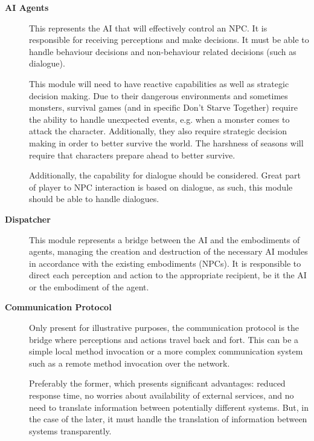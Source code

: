 \begin{description}
	\item[\textbf{AI Agents}] \hfill
    
    This represents the \ac{AI} that will effectively control an \ac{NPC}.
    It is responsible for receiving perceptions and make decisions.
    It must be able to handle behaviour decisions and non-behaviour related decisions (such as dialogue).
    
    This module will need to have reactive capabilities as well as strategic decision making.
    Due to their dangerous environments and sometimes monsters, survival games (and in specific Don't Starve Together) require the ability to handle unexpected events, e.g. when a monster comes to attack the character.
    Additionally, they also require strategic decision making in order to better survive the world.
    The harshness of seasons will require that characters prepare ahead to better survive.
    
    Additionally, the capability for dialogue should be considered.
    Great part of player to \ac{NPC} interaction is based on dialogue, as such, this module should be able to handle dialogues.
    
    \item[\textbf{Dispatcher}] \hfill
    
    This module represents a bridge between the \ac{AI} and the embodiments of agents, managing the creation and destruction of the necessary \ac{AI} modules in accordance with the existing embodiments (\acp{NPC}).
    It is responsible to direct each perception and action to the appropriate recipient, be it the \ac{AI} or the embodiment of the agent.
    
    \item[\textbf{Communication Protocol}] \hfill
    
    Only present for illustrative purposes, the communication protocol is the bridge where perceptions and actions travel back and fort.
    This can be a simple local method invocation or a more complex communication system such as a remote method invocation over the network.
    
    Preferably the former, which presents significant advantages: reduced response time, no worries about availability of external services, and no need to translate information between potentially different systems.
    But, in the case of the later, it must handle the translation of information between systems transparently.
    

\end{description}
